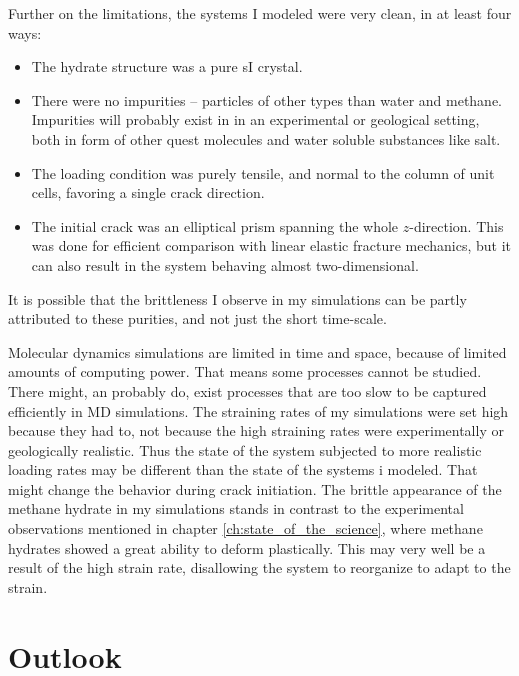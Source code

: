 Further on the limitations, the systems I modeled were very clean, in at least four ways: 
\begin{itemize}
\item The hydrate structure was a pure sI crystal. 
\item There were no impurities -- particles of other types than water and methane. Impurities will probably exist in in an experimental or geological setting, both in form of other quest molecules and water soluble substances like salt. 
\item The loading condition was purely tensile, and normal to the column of unit cells, favoring a single crack direction.
\item The initial crack was an elliptical prism spanning the whole $z$-direction. This was done for efficient comparison with linear elastic fracture mechanics, but it can also result in the system behaving almost two-dimensional. 
\end{itemize}
It is possible that the brittleness I observe in my simulations can be partly attributed to these purities, and not just the short time-scale.

Molecular dynamics simulations are limited in time and space, because of limited amounts of computing power. That means some processes cannot be studied. There might, an probably do, exist processes that are too slow to be captured efficiently in MD simulations. The straining rates of my simulations were set high because they had to, not because the high straining rates were experimentally or geologically realistic. Thus the state of the system subjected to more realistic loading rates may be different than the state of the systems i modeled. That might change the behavior during crack initiation. The brittle appearance of the methane hydrate in my simulations stands in contrast to the experimental observations mentioned in chapter \ref{ch:state_of_the_science}, where methane hydrates showed a great ability to deform plastically. This may very well be a result of the high strain rate, disallowing the system to reorganize to adapt to the strain.


\section{Outlook}

